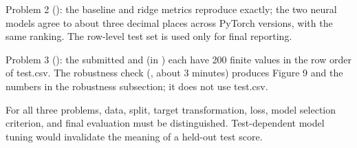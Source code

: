 \documentclass[10pt,letterpaper]{article}
\begin{document}
Problem 2 (): the baseline and ridge
metrics reproduce exactly; the two neural models agree to about three
decimal places across PyTorch versions, with the same ranking. The
row-level test set is used only for final reporting.

Problem 3 (): the submitted
 and 
(in ) each have 200 finite values in the row order
of test.csv. The robustness check (,
about 3 minutes) produces Figure 9 and the numbers in the robustness
subsection; it does not use test.csv.

For all three problems, data, split, target transformation, loss, model
selection criterion, and final evaluation must be distinguished.
Test-dependent model tuning would invalidate the meaning of a held-out
test score.
\end{document}
